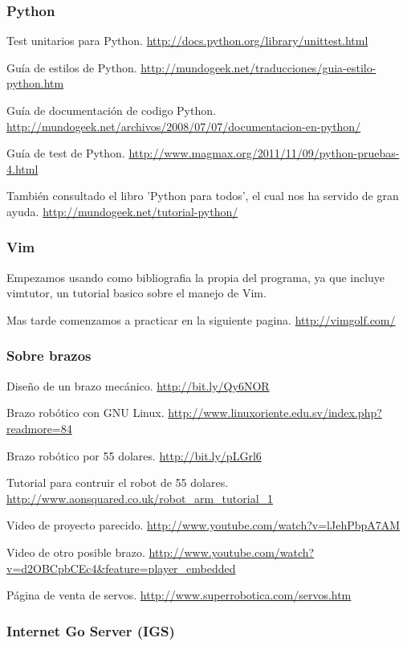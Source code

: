 \documentclass[12pt,a4papert,woside,openright,titlepage,final]{book}
\begin{document}
\subsubsection{Python }

Test unitarios para Python.
\url{http://docs.python.org/library/unittest.html}

Guía de estilos de Python.
\url{http://mundogeek.net/traducciones/guia-estilo-python.htm}

Guía de documentación de codigo Python.
\url{http://mundogeek.net/archivos/2008/07/07/documentacion-en-python/}

Guía de test de Python.
\url{http://www.magmax.org/2011/11/09/python-pruebas-4.html}

También consultado el libro 'Python para todos', el cual nos ha servido de gran
ayuda.
\url{http://mundogeek.net/tutorial-python/}

\subsubsection{Vim}

Empezamos usando como bibliografia la propia del programa, ya que incluye
vimtutor, un tutorial basico sobre el manejo de Vim.

Mas tarde comenzamos a practicar en la siguiente pagina.
\url{http://vimgolf.com/}

\subsubsection{Sobre brazos}

Diseño de un brazo mecánico.
\url{http://bit.ly/Qy6NOR}

Brazo robótico con GNU  Linux.
\url{http://www.linuxoriente.edu.sv/index.php?readmore=84}

Brazo robótico por 55 dolares.
\url{http://bit.ly/pLGrl6}

Tutorial para contruir el robot de 55 dolares.
\url{http://www.aonsquared.co.uk/robot_arm_tutorial_1}

Video de proyecto parecido.
\url{http://www.youtube.com/watch?v=lJehPbpA7AM}

Video de otro posible brazo.
\url{http://www.youtube.com/watch?v=d2OBCpbCEc4&feature=player_embedded}

Página de venta de servos.
\url{http://www.superrobotica.com/servos.htm}


\subsubsection{Internet Go Server (IGS)}
\end{document}
